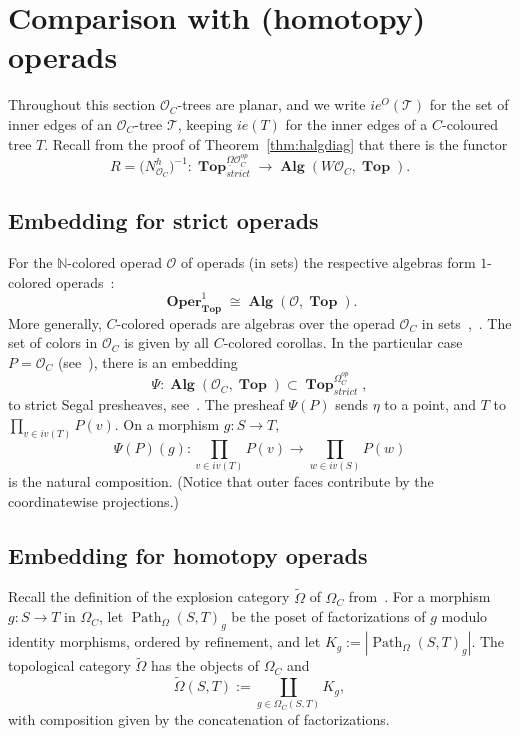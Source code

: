 \documentclass{amsart}
\theoremstyle{definition}
\theoremstyle{remark}
\newcommand{\N}{\mathbb N}
\DeclareMathOperator{\Top}{\mathbf{Top}}
\DeclareMathOperator{\Oper}{\mathbf{Oper}}
\DeclareMathOperator{\Alg}{\mathbf{Alg}}
\DeclareMathOperator{\Path}{Path}
\begin{document}
	\section{Comparison with (homotopy) operads}\label{sec:compoper}

	Throughout this section $\mathcal{O}_C$-trees are planar, and we write $ie^{O}(\mathcal{T})$
	for the set of inner edges of an $\mathcal{O}_C$-tree $\mathcal{T}$, keeping $ie(T)$ for the
	inner edges of a $C$-coloured tree $T$. 
	Recall from the proof of Theorem~\ref{thm:halgdiag} that there is the functor
	\[
	R=\bigl(N^h_{\mathcal{O}_C}\bigr)^{-1}\colon
	\Top^{\underline{\Omega}{\mathcal{O}_C^{op}}}_{strict}
	\rightarrow \Alg(W\mathcal{O}_C,\Top).
	\]
	
	\subsection{Embedding for strict operads}\label{ssec:strictop}

	For the $\N$-colored operad $\mathcal{O}$ of operads (in sets) the respective algebras form $1$-colored operads~\cite[\S2.4]{clrrw-22}:
	\[
		\Oper^{1}_{\Top}\cong 	\Alg(\mathcal{O},\Top).
	\]
	More generally, $C$-colored operads are algebras over the operad $\mathcal{O}_{C}$ in sets~\cite[\S 1.5.6, \S 1.5.7]{be-mo-06},~\cite[\S 3]{gu-vo-12}.	
	The set of colors in $\mathcal{O}_{C}$ is given by all $C$-colored corollas.
	In the particular case $P=\mathcal{O}_{C}$ (see~\cite{clrrw-22}), there is an embedding
	\[
		\Psi\colon 	\Alg(\mathcal{O}_{C},\Top)\subset \Top^{\Omega^{op}_{C}}_{strict},
	\]
	to strict Segal presheaves, see~\cite{clrrw-22}.
	The presheaf $\Psi(P)$ sends $\eta$ to a point, and $T$ to $\prod_{v\in iv(T)} P(v)$.
	On a morphism $g\colon S\to T$, 
	\[
	\Psi(P)(g)\colon \prod_{v\in iv(T)} P(v)\to \prod_{w\in iv(S)} P(w)
	\]
	is the natural composition.
	(Notice that outer faces contribute by the coordinatewise projections.)

	\subsection{Embedding for homotopy operads}\label{ssec:homop}
	Recall the definition of the explosion category $\widetilde{\Omega}$ of $\Omega_C$ from~\cite[Def.~B.1]{clrrw-22}.
	For a morphism $g\colon S\to T$ in $\Omega_C$, let $\Path_\Omega(S,T)_g$ be the poset of
	factorizations of $g$ modulo identity morphisms, ordered by refinement, and let
	$K_g:=|\Path_\Omega(S,T)_g|$. The topological category $\widetilde\Omega$ has the
	objects of $\Omega_C$ and
	\[
	\widetilde{\Omega}(S,T):=
	\coprod_{g\in\Omega_C(S,T)}K_g ,
	\]
	with composition given by the concatenation of factorizations. 
	
\end{document}
